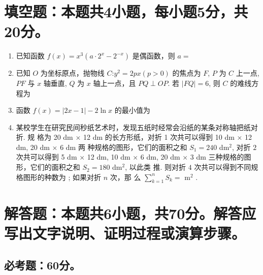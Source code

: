 \documentclass[11pt,space]{ctexart} %
\begin{document}
\section{填空题：本题共4小题，每小题5分，共20分。}
\begin{enumerate}[itemsep=0.3em,topsep=0pt,resume]%

\item  已知函数 $ f(x)=x^{3}\left(a \cdot 2^{x}-2^{-x}\right) $ 是偶函数，则 $ a= $ \blank{}
\item  已知 $ O$  为坐标原点，抛物线 $ C$:$ y^{2}=2 p x(p>0)$  的焦点为 $ F$, $P $ 为 $ C$  上一点, $ P F$  与 $x$  轴垂直, $ Q $ 为 $  x $ 轴上一点，且 $ P Q \perp O P $.  若 $ |F Q|=6 $, 则 $ C $ 的难线方程为 \blank{}
\item  函数 $ f(x)=|2 x-1|-2 \ln x$  的最小值为 \blank{}
\item  某校学生在研究民间秒纸艺术时，发现五纸时经常会沿纸的某条对称轴把纸对折. 规
格为  20 dm $\times$ 12 dm  的长方形纸，对折 1 次共可以得到  10 dm $\times$ 12 dm, 20 dm $\times$ 6 dm  两
种规格的图形，它们的面积之和  $S_{1}=240$ dm$^{2} $, 对折 $2$ 次共可以得到  5 dm $\times$ 12 dm,
	10 dm $\times$ 6 dm, 20 dm $\times$ 3 dm  三种规格的图形，它们的面积之和  $S_{2}=180$ dm$^{2} $, 以此类
推. 则对折 $4$ 次共可以得到不同规格图形的种数为 \blank{}; 如果对折 $ n $ 次，那
么 $ \sum\limits_{k=1}^{n} S_{k}=$ \blank{} m$^{2}$ .

\end{enumerate}

\section{解答题：本题共6小题，共70分。解答应写出文字说明、证明过程或演算步骤。}
\subsection{必考题：60分。}
\end{document}
